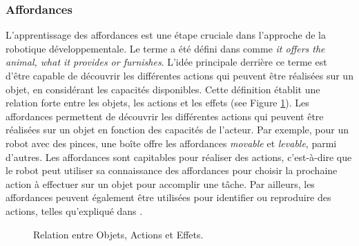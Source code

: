 \documentclass{llncs}
\begin{document}
\subsubsection{Affordances}
L'apprentissage des affordances est une étape cruciale dans l'approche de la robotique développementale. Le terme a été défini dans \cite{opac-b1085639} comme \textit{it offers the animal, what it provides or furnishes}. L'idée principale derrière ce terme est d'être capable de découvrir les différentes actions qui peuvent être réalisées sur un objet, en considérant les capacités disponibles. Cette définition établit une relation forte entre les objets, les actions et les effets (see Figure \ref{fig:affordances}). Les affordances permettent de découvrir les différentes actions qui peuvent être réalisées sur un objet en fonction des capacités de l'acteur. Par exemple, pour un robot avec des pinces, une boîte offre les affordances  \textit{movable} et \textit{levable}, parmi d'autres. Les affordances sont capitables pour réaliser des actions, c'est-à-dire que le robot peut utiliser sa connaissance des affordances pour choisir la prochaine action à effectuer sur un objet pour accomplir une tâche. Par ailleurs, les affordances peuvent également être utilisées pour identifier ou reproduire des actions, telles qu'expliqué dans \cite{4399517}.



\begin{figure}[!h]
\centering

  \label{fig:affordances}
	\caption{Relation entre Objets, Actions et Effets.}

\end{figure}
\end{document}
